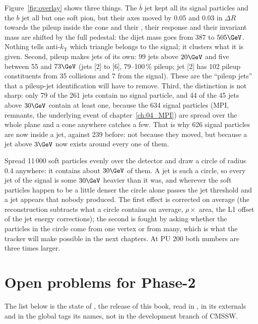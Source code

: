 Figure~\ref{fig:overlay} shows three things. The $\bar b$ jet kept all its signal particles and the $b$ jet
all but one soft pion, but their axes moved by 0.05 and 0.03 in $\Delta R$ towards the pileup inside the cone
and their \pt{}, their response and their invariant mass are shifted by the full pedestal: the dijet mass goes
from 387 to $505\GeV$. Nothing tells anti-$k_{\mathrm{T}}$ which triangle belongs to the signal; it clusters what it is
given. Second, pileup makes jets of its own: 99 jets above $20\GeV$ and five between 55 and $73\GeV$
(jets [2] to [6], 79--100\,\% pileup; jet [2] has 102 pileup constituents from 35 collisions and 7 from the
signal). These are the ``pileup jets'' that a pileup-jet identification will have to remove. Third, the
distinction is not sharp: only 79 of the 261 jets contain no signal particle, and 44 of the 45 jets above
$30\GeV$ contain at least one, because the 634 signal particles (MPI, remnants, the underlying event of
chapter~\ref{ch:04_MPI}) are spread over the whole plane and a cone anywhere catches a few. That is why 626
signal particles are now inside a jet, against 239 before: not because they moved, but because a jet above
$3\GeV$ now exists around every one of them.

\begin{plainwords}
Spread 11\,000 soft particles evenly over the detector and draw a circle of radius 0.4 anywhere: it contains
about $30\GeV$ of them. A jet is such a circle, so every jet of the signal is some $30\GeV$ heavier than it
was, and wherever the soft particles happen to be a little denser the circle alone passes the jet threshold
and a jet appears that nobody produced. The first effect is corrected on average (the reconstruction
subtracts what a circle contains on average, $\rho\times$ area, the L1 offset of the jet energy
corrections); the second is fought by asking whether the particles in the circle come from one vertex or
from many, which is what the tracker will make possible in the next chapters. At PU 200 both numbers are
three times larger.
\end{plainwords}

\section{Open problems for Phase-2}

The list below is the state of , the release of this book, read in
, in its externals and in the global tags its  names, not in the
development branch of CMSSW.

